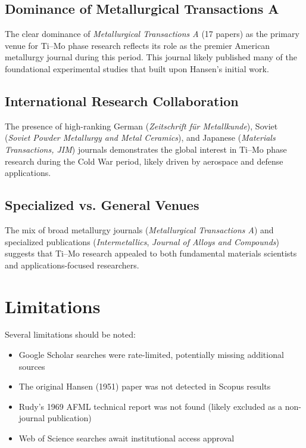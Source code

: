 \documentclass[11pt,a4paper]{article}
\begin{document}
\subsection{Dominance of Metallurgical Transactions A}

The clear dominance of \textit{Metallurgical Transactions A} (17 papers) as the primary venue for Ti--Mo phase research reflects its role as the premier American metallurgy journal during this period. This journal likely published many of the foundational experimental studies that built upon Hansen's initial work.

\subsection{International Research Collaboration}

The presence of high-ranking German (\textit{Zeitschrift f{\"u}r Metallkunde}), Soviet (\textit{Soviet Powder Metallurgy and Metal Ceramics}), and Japanese (\textit{Materials Transactions, JIM}) journals demonstrates the global interest in Ti--Mo phase research during the Cold War period, likely driven by aerospace and defense applications.

\subsection{Specialized vs. General Venues}

The mix of broad metallurgy journals (\textit{Metallurgical Transactions A}) and specialized publications (\textit{Intermetallics}, \textit{Journal of Alloys and Compounds}) suggests that Ti--Mo research appealed to both fundamental materials scientists and applications-focused researchers.

\section{Limitations}

Several limitations should be noted:
\begin{itemize}
    \item Google Scholar searches were rate-limited, potentially missing additional sources
    \item The original Hansen (1951) paper was not detected in Scopus results
    \item Rudy's 1969 AFML technical report was not found (likely excluded as a non-journal publication)
    \item Web of Science searches await institutional access approval
\end{itemize}
\end{document}
